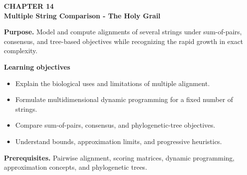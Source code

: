 \documentclass[11pt]{article}
\begin{document}
\begin{tcolorbox}[
  enhanced,breakable,colback=Primary!4,colframe=Primary,boxrule=0.9pt,
  arc=2mm,left=3mm,right=3mm,top=2.5mm,bottom=2.5mm]
{\sffamily\color{Accent}\bfseries CHAPTER 14}\\[-1pt]
{\sffamily\LARGE\bfseries\color{Primary} Multiple String Comparison - The Holy Grail}

\vspace{2pt}
\textbf{Purpose.} Model and compute alignments of several strings under sum-of-pairs, consensus, and tree-based objectives while recognizing the rapid growth in exact complexity.

\textbf{Learning objectives}
\begin{itemize}
  \item Explain the biological uses and limitations of multiple alignment.
  \item Formulate multidimensional dynamic programming for a fixed number of strings.
  \item Compare sum-of-pairs, consensus, and phylogenetic-tree objectives.
  \item Understand bounds, approximation limits, and progressive heuristics.
\end{itemize}

\textbf{Prerequisites.} Pairwise alignment, scoring matrices, dynamic programming, approximation concepts, and phylogenetic trees.
\end{tcolorbox}
\end{document}
